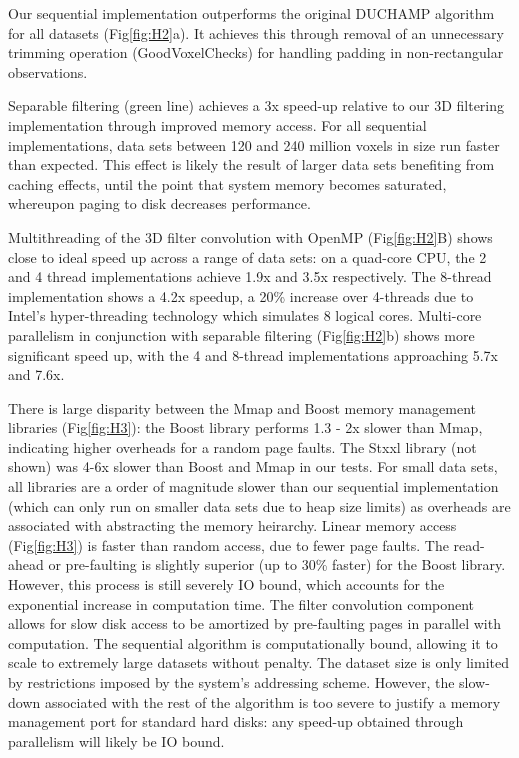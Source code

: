 Our sequential implementation outperforms the original DUCHAMP algorithm for all datasets (Fig\ref{fig:H2}a).  It achieves this through removal of an unnecessary  trimming operation (GoodVoxelChecks) for handling padding in non-rectangular observations.  

Separable filtering (green line) achieves a 3x speed-up relative to our 3D filtering implementation  through improved memory access. 
For all sequential implementations, data sets between  120 and 240 million voxels in size run faster than expected. This effect is likely the result of
larger data sets benefiting from caching effects, until  the point that system memory becomes saturated, whereupon paging to disk decreases performance.

Multithreading  of the 3D filter convolution  with OpenMP (Fig\ref{fig:H2}B) shows close to ideal speed up across a range of data sets:
on a quad-core CPU, the 2 and 4 thread implementations achieve 1.9x and 3.5x respectively.  The 8-thread implementation shows a 4.2x speedup, a 20\% increase over 4-threads due to  Intel's hyper-threading technology which simulates 8 logical cores. 
Multi-core parallelism in conjunction with separable filtering (Fig\ref{fig:H2}b) shows more significant speed up, with the 4 and 8-thread implementations approaching 5.7x and 7.6x. 

There is large disparity between the Mmap and Boost memory management libraries (Fig\ref{fig:H3}): the Boost library performs  1.3 - 2x slower than Mmap, indicating higher overheads for a random page faults.   The Stxxl library (not shown) was 4-6x slower than Boost and Mmap in our tests.
For small data sets, all libraries are a order of magnitude slower than our sequential implementation (which can only run on smaller data sets due to heap size limits) as overheads are associated with
abstracting the memory heirarchy.
Linear memory access (Fig\ref{fig:H3}) is faster than random access, due to fewer page faults. The read-ahead or pre-faulting is slightly superior (up to 30\% faster) for the Boost library. However, this process is still severely IO bound,  which accounts for the exponential increase in computation time.
The filter convolution component allows for slow disk access to be amortized by pre-faulting pages in parallel with computation. 
The sequential algorithm is  computationally bound, allowing it to scale to extremely large datasets without penalty. The dataset size is only limited by restrictions imposed by the system's addressing scheme. 
However, the slow-down associated with the rest of the algorithm is too severe to justify a memory management port for standard hard disks:
any speed-up obtained through parallelism will likely be IO bound.

